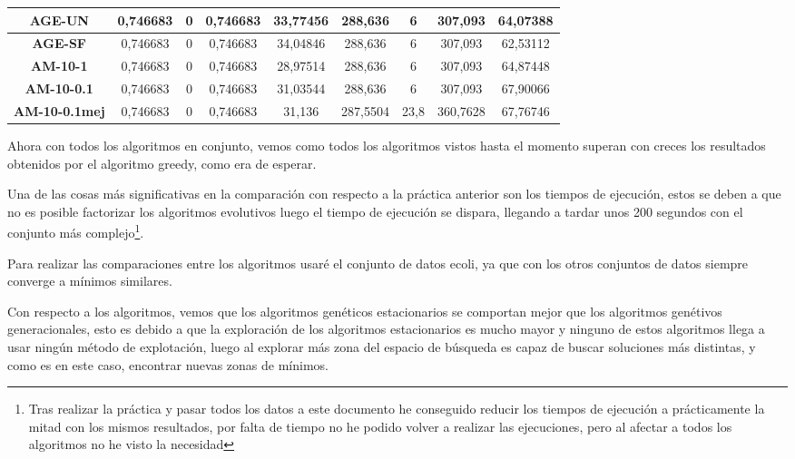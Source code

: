 \documentclass[12pt, spanish]{article}
\begin{document}
\begin{table}[H]
\begin{tabular}{|c|c|c|c|c|c|c|c|c|}
\textbf{AGE-UN}       & 0,746683                  & 0                           & 0,746683               & 33,77456   & 288,636                   & 6                           & 307,093                & 64,07388   \\ \hline
\textbf{AGE-SF}       & 0,746683                  & 0                           & 0,746683               & 34,04846   & 288,636                   & 6                           & 307,093                & 62,53112   \\ \hline
\textbf{AM-10-1}      & 0,746683                  & 0                           & 0,746683               & 28,97514   & 288,636                   & 6                           & 307,093                & 64,87448   \\ \hline
\textbf{AM-10-0.1}    & 0,746683                  & 0                           & 0,746683               & 31,03544   & 288,636                   & 6                           & 307,093                & 67,90066   \\ \hline
\textbf{AM-10-0.1mej} & 0,746683                  & 0                           & 0,746683               & 31,136     & 287,5504                  & 23,8                        & 360,7628               & 67,76746   \\ \hline
\end{tabular}
\end{table}


Ahora con todos los algoritmos en conjunto, vemos como todos los algoritmos vistos hasta el momento superan con creces los resultados obtenidos por el algoritmo greedy, como era de esperar.

Una de las cosas más significativas en la comparación con respecto a la práctica anterior son los tiempos de ejecución, estos se deben a que no es posible factorizar los algoritmos evolutivos luego el tiempo de ejecución se dispara, llegando a tardar unos 200 segundos con el conjunto más complejo\footnote{Tras realizar la práctica y pasar todos los datos a este documento he conseguido reducir los tiempos de ejecución a prácticamente la mitad con los mismos resultados, por falta de tiempo no he podido volver a realizar las ejecuciones, pero al afectar a todos los algoritmos no he visto la necesidad}.

Para realizar las comparaciones entre los algoritmos usaré el conjunto de datos ecoli, ya que con los otros conjuntos de datos siempre converge a mínimos similares.

Con respecto a los algoritmos, vemos que los algoritmos genéticos estacionarios se comportan mejor que los algoritmos genétivos generacionales, esto es debido a que la exploración de los algoritmos estacionarios es mucho mayor y ninguno de estos algoritmos llega a usar ningún método de explotación, luego al explorar más zona del espacio de búsqueda es capaz de buscar soluciones más distintas, y como es en este caso, encontrar nuevas zonas de mínimos.
\end{document}
